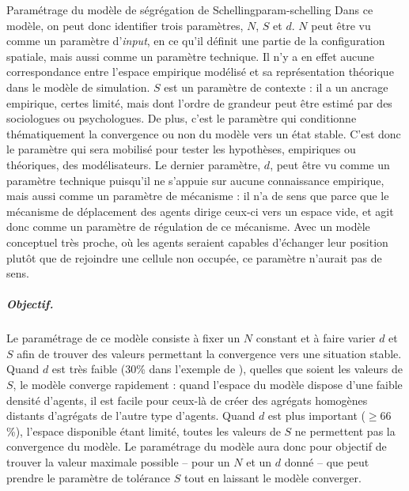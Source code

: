 \begin{encadre}{Paramétrage du modèle de ségrégation de Schelling}{param-schelling}
Dans ce modèle, on peut donc identifier trois paramètres, $N$, $S$ et $d$.
$N$ peut être vu comme un paramètre d'\textit{input}, en ce qu'il définit une partie de la configuration spatiale, mais aussi comme un paramètre technique.
Il n'y a en effet aucune correspondance entre l'espace empirique modélisé et
sa représentation théorique dans le modèle de simulation.
$S$ est un paramètre de contexte : il a un ancrage empirique, certes limité, mais dont l'ordre de grandeur peut être estimé par des sociologues ou psychologues.
De plus, c'est le paramètre qui conditionne thématiquement la convergence ou non du modèle vers un état stable.
C'est donc le paramètre qui sera mobilisé pour tester les hypothèses, empiriques ou théoriques, des modélisateurs.
Le dernier paramètre, $d$, peut être vu comme un paramètre technique puisqu'il ne s'appuie sur aucune connaissance empirique, mais aussi comme un paramètre de mécanisme : il n'a de sens que parce que le mécanisme de déplacement des agents dirige ceux-ci vers un \og espace vide\fg{}, et agit donc comme un paramètre de régulation de ce mécanisme.
Avec un modèle conceptuel très proche, où les agents seraient capables \og d'échanger\fg{} leur position plutôt que de rejoindre une cellule non occupée, ce paramètre n'aurait pas de sens.

\subparagraph{Objectif.}
Le paramétrage de ce modèle consiste à fixer un $N$ constant et à faire varier $d$ et $S$ afin de trouver des valeurs permettant la convergence vers une situation stable.
Quand $d$ est très faible ($30$\% dans l'exemple de \textcite{daude_comparaison_2006}), quelles que soient les valeurs de $S$, le modèle converge rapidement :
	quand l'espace du modèle dispose d'une faible densité d'agents, il est facile pour ceux-là de créer des agrégats homogènes distants d'agrégats de l'autre type d'agents.
Quand $d$ est plus important ($\geq66$\%), l'espace disponible étant limité, toutes les valeurs de $S$ ne permettent pas la convergence du modèle.
Le paramétrage du modèle aura donc pour objectif de trouver la valeur maximale possible -- pour un $N$ et un $d$ donné -- que peut prendre le paramètre de tolérance $S$ tout en laissant le modèle converger.


\end{encadre}
